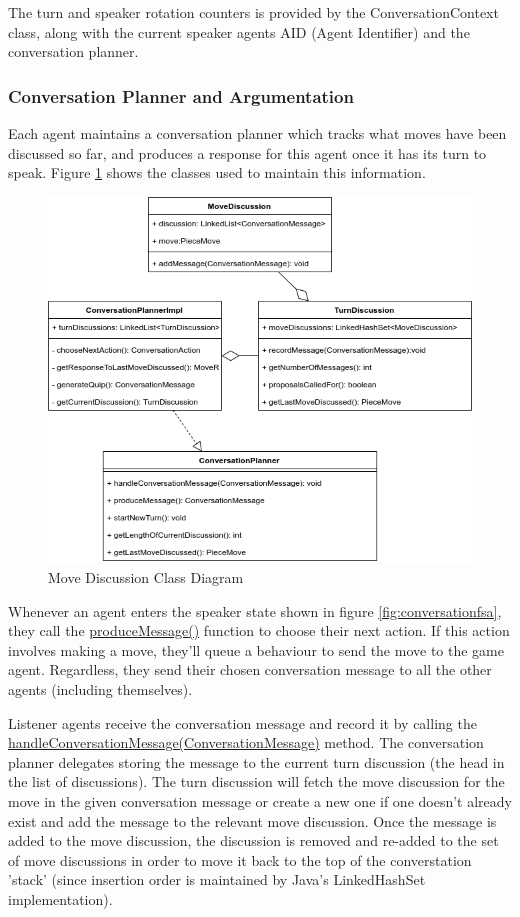 \documentclass{article}
\begin{document}
The turn and speaker rotation counters is provided by the ConversationContext class, along with the current speaker agents AID (Agent Identifier) and the conversation planner. 

\subsubsection{Conversation Planner and Argumentation}

Each agent maintains a conversation planner which tracks what moves have been discussed so far, and produces a response for this agent once it has its turn to speak. Figure \ref{fig:movediscussion} shows the classes used to maintain this information.

\begin{figure}[]
	\centering
	\includegraphics[width=0.8\linewidth]{images/movediscussion}
	\caption{Move Discussion Class Diagram}
	\label{fig:movediscussion}
\end{figure}

Whenever an agent enters the speaker state shown in figure \ref{fig:conversationfsa}, they call the \url{produceMessage()} function to choose their next action. If this action involves making a move, they'll queue a behaviour to send the move to the game agent. Regardless, they send their chosen conversation message to all the other agents (including themselves).

Listener agents receive the conversation message and record it by calling the \url{handleConversationMessage(ConversationMessage)} method. The conversation planner delegates storing the message to the current turn discussion (the head in the list of discussions). The turn discussion will fetch the move discussion for the move in the given conversation message or create a new one if one doesn't already exist and add the message to the relevant move discussion. Once the message is added to the move discussion, the discussion is removed and re-added to the set of move discussions in order to move it back to the top of the converstation 'stack' (since insertion order is maintained by Java's LinkedHashSet implementation). 
\end{document}
